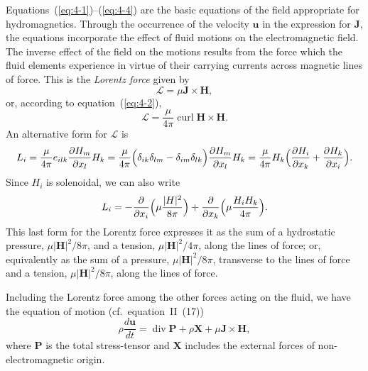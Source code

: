 Equations~(\ref{eq:4-1})--(\ref{eq:4-4}) are the basic equations of the field appropriate for hydromagnetics. Through the occurrence of the velocity $\mathbf{u}$ in the expression for $\mathbf{J}$, the equations incorporate the effect of fluid motions on the electromagnetic field. The inverse effect of the field on the motions results from the force which the fluid elements experience in virtue of their carrying currents across magnetic lines of force. This is the \emph{Lorentz force} given by
\begin{equation}
\label{eq:4-5}
\boldsymbol{\mathscr{L}} = \mu \mathbf{J}\times\mathbf{H},
\end{equation}
or, according to equation~(\ref{eq:4-2}),
\begin{equation}
\label{eq:4-6}
\boldsymbol{\mathscr{L}} = \frac{\mu}{4\pi}\operatorname{curl}\mathbf{H}\times\mathbf{H}.
\end{equation}
An alternative form for $\boldsymbol{\mathscr{L}}$ is
\begin{equation}
\label{eq:4-7}
\mathscr{L}_i = \frac{\mu}{4\pi}e_{ilk}\frac{\partial H_m}{\partial x_l}H_k = \frac{\mu}{4\pi}\Bigl(\delta_{ik}\delta_{lm}-\delta_{im}\delta_{lk}\Bigr)\frac{\partial H_m}{\partial x_l}H_k = \frac{\mu}{4\pi}H_k\Bigl(\frac{\partial H_i}{\partial x_k}+\frac{\partial H_k}{\partial x_i}\Bigr).
\end{equation}
Since $H_i$ is solenoidal, we can also write
\begin{equation}
\label{eq:4-8}
\mathscr{L}_i = -\frac{\partial}{\partial x_i}\Bigl(\mu\frac{|\mathbf{H}|^2}{8\pi}\Bigr)+\frac{\partial}{\partial x_k}\Bigl(\mu\frac{H_i H_k}{4\pi}\Bigr).
\end{equation}
This last form for the Lorentz force expresses it as the sum of a hydrostatic pressure, $\mu|\mathbf{H}|^2/8\pi$, and a tension, $\mu|\mathbf{H}|^2/4\pi$, along the lines of force; or, equivalently as the sum of a pressure, $\mu|\mathbf{H}|^2/8\pi$, transverse to the lines of force and a tension, $\mu|\mathbf{H}|^2/8\pi$, along the lines of force.

Including the Lorentz force among the other forces acting on the fluid, we have the equation of motion (cf.\ equation~II~(17))
\begin{equation}
\label{eq:4-9}
\rho\frac{d\mathbf{u}}{dt} = \operatorname{div}\mathbf{P}+\rho\mathbf{X}+\mu\mathbf{J}\times\mathbf{H},
\end{equation}
where $\mathbf{P}$ is the total stress-tensor and $\mathbf{X}$ includes the external forces of non-electromagnetic origin.


